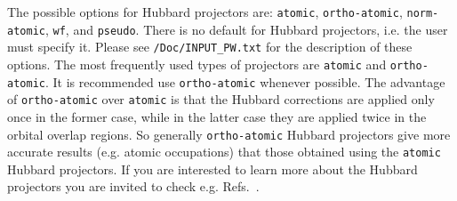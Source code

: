 \documentclass[12pt,a4paper]{article}
\begin{document}
The possible options for Hubbard projectors are: \texttt{atomic}, \texttt{ortho-atomic}, \texttt{norm-atomic}, \texttt{wf}, and \texttt{pseudo}. There is no default for Hubbard projectors, i.e. the user must specify it. Please see \texttt{/Doc/INPUT\_PW.txt} for the description of these options. The most frequently used types of projectors are \texttt{atomic} and \texttt{ortho-atomic}. It is recommended use \texttt{ortho-atomic} whenever possible. The advantage of \texttt{ortho-atomic} over \texttt{atomic} is that the Hubbard corrections are applied only once in the former case, while in the latter case they are applied twice in the orbital overlap regions. So generally \texttt{ortho-atomic} Hubbard projectors give more accurate results (e.g. atomic occupations) that those obtained using the \texttt{atomic} Hubbard projectors. If you are interested to learn more about the Hubbard projectors you are invited to check e.g. Refs.~\cite{Wang:2016, Mahajan:2021}.
\end{document}
